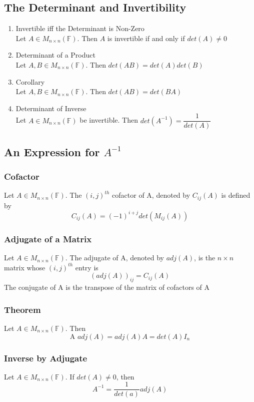 \documentclass[12pt, letterpaper]{article}
\begin{document}
\subsection{The Determinant and Invertibility}
\begin{enumerate}
    \item Invertible iff the Determinant is Non-Zero \\
          Let $A\in M_{n\times n}(\mathbb{F})$. Then $A$ is invertible if and only if $det(A)\neq 0$
    \item Determinant of a Product \\
          Let $A, B\in M_{n\times n}(\mathbb{F})$. Then $det(AB) = det(A)det(B)$
    \item Corollary \\
          Let $A, B\in M_{n\times n}(\mathbb{F})$. Then $det(AB) = det(BA)$
    \item Determinant of Inverse \\
          Let $A\in M_{n\times n}(\mathbb{F})$ be invertible. Then $det(A^{-1}) = \dfrac{1}{det(A)}$
\end{enumerate}
\subsection{An Expression for $A^{-1}$}
\subsubsection{Cofactor}
Let $A\in M_{n\times n}(\mathbb{F})$. The $(i,j)^{th}$ cofactor of A, denoted by $C_{ij}(A)$ is defined by 
\[C_{ij}(A) = (-1)^{i+j}det(M_{ij}(A))\]
\subsubsection{Adjugate of a Matrix}
Let $A\in M_{n\times n}(\mathbb{F})$. The adjugate of A, denoted by $adj(A)$, is the $n\times n$ matrix whose $(i,j)^{th}$ entry is 
\[(adj(A))_{ij} = C_{ij}(A)\]
The conjugate of A is the transpose of the matrix of cofactors of A 
\subsubsection{Theorem}
Let $A\in M_{n\times n}(\mathbb{F})$. Then 
\[\text{A }adj(A) = adj(A)A = det(A)I_n\]
\subsubsection{Inverse by Adjugate}
Let $A\in M_{n\times n}(\mathbb{F})$. If $det(A)\neq 0$, then 
\[A^{-1} = \dfrac{1}{det(a)}adj(A)\]
\end{document}

